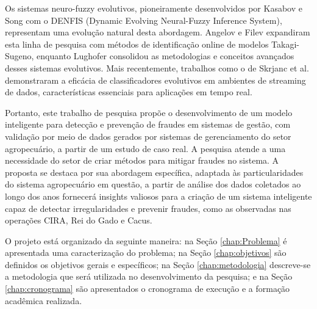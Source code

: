 Os sistemas neuro-fuzzy evolutivos, pioneiramente desenvolvidos por Kasabov e Song \cite{kasabov-2002} com o DENFIS (Dynamic Evolving Neural-Fuzzy Inference System), representam uma evolução natural desta abordagem. Angelov e Filev \cite{angelov-2004b} expandiram esta linha de pesquisa com métodos de identificação online de modelos Takagi-Sugeno, enquanto Lughofer \cite{Lughofer2011} consolidou as metodologias e conceitos avançados desses sistemas evolutivos. Mais recentemente, trabalhos como o de Skrjanc et al. \cite{Skrjanc2019a} demonstraram a eficácia de classificadores evolutivos em ambientes de streaming de dados, características essenciais para aplicações em tempo real.

Portanto, este trabalho de pesquisa propõe o desenvolvimento de um modelo inteligente para detecção e prevenção de fraudes em sistemas de gestão, com validação por meio de dados gerados por sistemas de gerenciamento do setor agropecuário, a partir de um estudo de caso real. A pesquisa atende a uma necessidade do setor de criar métodos para mitigar fraudes no sistema. A proposta se destaca por sua abordagem específica, adaptada às particularidades do sistema agropecuário em questão, a partir de análise dos dados coletados ao longo dos anos fornecerá insights valiosos para a criação de um sistema inteligente capaz de detectar irregularidades e prevenir fraudes, como as observadas nas operações CIRA, Rei do Gado e Cacus.

O projeto está organizado da seguinte maneira: na Seção \ref{chap:Problema} é apresentada uma caracterização do problema; na Seção \ref{chap:objetivos} são definidos os objetivos gerais e específicos; na Seção \ref{chap:metodologia} descreve-se a metodologia que será utilizada no desenvolvimento da pesquisa; e na Seção \ref{chap:cronograma} são apresentados o cronograma de execução e a formação acadêmica realizada.
